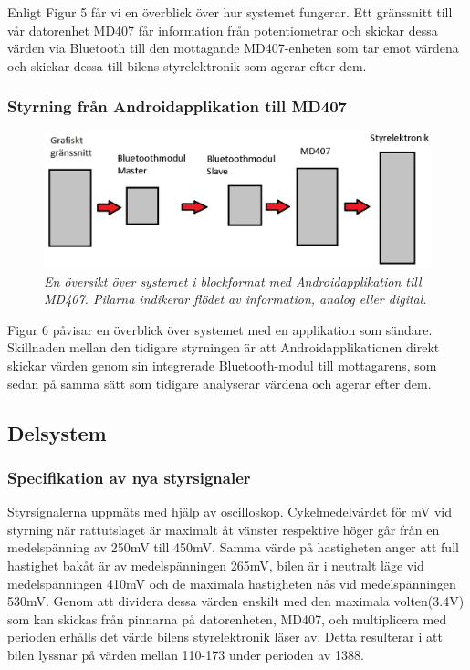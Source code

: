 \documentclass[a4paper]{article}
\begin{document}
Enligt Figur 5 får vi en överblick över hur systemet fungerar. Ett gränssnitt till vår datorenhet MD407 får information från potentiometrar och skickar dessa värden via Bluetooth till den mottagande MD407-enheten som tar emot värdena och skickar dessa till bilens styrelektronik som agerar efter dem.

\subsubsection{Styrning från Androidapplikation till MD407}
\begin{figure}[H]
\includegraphics[width=\textwidth]{systemoversiktAndroid.jpg}
\centering
\caption{\it En översikt över systemet i blockformat med Androidapplikation till MD407. Pilarna indikerar flödet av information, analog eller digital.}
\end{figure} 

Figur 6 påvisar en överblick över systemet med en applikation som sändare. Skillnaden mellan den tidigare styrningen är att Androidapplikationen direkt skickar värden genom sin integrerade Bluetooth-modul till mottagarens, som sedan på samma sätt som tidigare analyserar värdena och agerar efter dem.


\subsection{Delsystem}
\subsubsection{Specifikation av nya styrsignaler}
Styrsignalerna uppmäts med hjälp av oscilloskop. Cykelmedelvärdet för mV vid styrning när rattutslaget är maximalt åt vänster respektive höger går från en medelspänning av 250mV till 450mV. Samma värde på hastigheten anger att full hastighet bakåt är av medelspänningen 265mV, bilen är i neutralt läge vid medelspänningen 410mV och de maximala hastigheten nås vid medelspänningen 530mV. Genom att dividera dessa värden enskilt med den maximala volten(3.4V) som kan skickas från pinnarna på datorenheten, MD407, och multiplicera med perioden erhålls det värde bilens styrelektronik läser av. Detta resulterar i att bilen lyssnar på värden mellan 110-173 under perioden av 1388.
\end{document}
